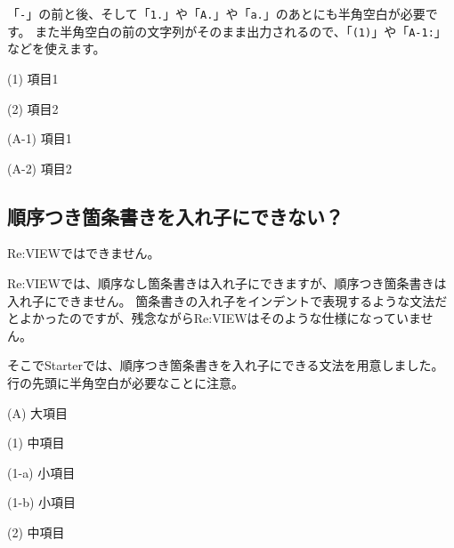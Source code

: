 \endstarterresult

「\texttt{{-}}」の前と後、そして「\texttt{1.}」や「\texttt{A.}」や「\texttt{a.}」のあとにも半角空白が必要です。
また半角空白の前の文字列がそのまま出力されるので、「\texttt{(1)}」や「\texttt{A{-}1:}」などを使えます。

\begin{starterprogram}\end{starterprogram}
\noindent
{}

\starterresult

\begin{starterenumerate}
\item[(1)] 項目1
\item[(2)] 項目2
\end{starterenumerate}

\begin{starterenumerate}
\item[(A{-}1)] 項目1
\item[(A{-}2)] 項目2
\end{starterenumerate}

\endstarterresult

\subsection{順序つき箇条書きを入れ子にできない？}
\label{sec:2-2-3}

Re:VIEWではできません。

Re:VIEWでは、順序なし箇条書きは入れ子にできますが、順序つき箇条書きは入れ子にできません。
箇条書きの入れ子をインデントで表現するような文法だとよかったのですが、残念ながらRe:VIEWはそのような仕様になっていません。

そこでStarterでは、順序つき箇条書きを入れ子にできる文法を用意しました。
行の先頭に半角空白が必要なことに注意。

\begin{starterprogram}\end{starterprogram}
\noindent
{}

\starterresult

\begin{starterenumerate}
\item[(A)] 大項目

\begin{starterenumerate}
\item[(1)] 中項目

\begin{starterenumerate}
\item[(1{-}a)] 小項目
\item[(1{-}b)] 小項目
\end{starterenumerate}

\item[(2)] 中項目
\end{starterenumerate}

\end{starterenumerate}

